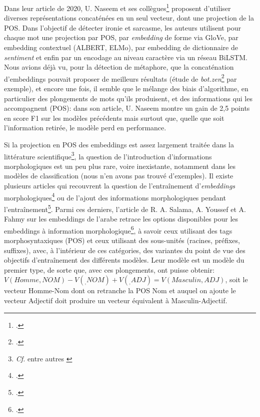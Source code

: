 Dans leur article de 2020, U. Naseem et ses collègues\footcite{naseem_towards_2020} proposent d'utiliser diverses représentations concaténées en un seul vecteur, dont une projection de la POS. Dans l'objectif de détecter ironie et sarcasme, les auteurs utilisent pour chaque mot une projection par POS, par \textit{embedding} de forme via GloVe, par embedding contextuel (ALBERT, ELMo), par embedding de dictionnaire de \textit{sentiment} et enfin par un encodage au niveau caractère via un réseau BiLSTM. Nous avions déjà vu, pour la détection de métaphore, que la concaténation d'embeddings pouvait proposer de meilleurs résultats (étude de \textit{bot.zen}\footcite{stemle_using_2018} par exemple), et encore une fois, il semble que le mélange des biais d'algorithme, en particulier des plongements de mots qu'ils produisent, et des informations qui les accompagnent (POS): dans son article, U. Naseem montre un gain de 2,5 points en score F1 sur les modèles précédents mais surtout que, quelle que soit l'information retirée, le modèle perd en performance.


Si la projection en POS des embeddings est assez largement traitée dans la littérature scientifique\footnote{\textit{Cf.} entre autres \textcite{fell_comparing_2019,leong_report_2018}}, la question de l'introduction d'informations morphologiques est un peu plus rare, voire inexistante, notamment dans les modèles de classification (nous n'en avons pas trouvé d'exemples). Il existe plusieurs articles qui recouvrent la question de l'entraînement d'\textit{embeddings} morphologiques\footcite{cotterell_morphological_2015} ou de l'ajout des informations morphologiques pendant l'entraînement\footcite{cui_knet_2015}. Parmi ces derniers, l'article de R. A. Salama, A. Youssef et A. Fahmy sur les embeddings de l'arabe retrace les options disponibles pour les embeddings à information morphologique\footcite{salama_morphological_2018}, à savoir ceux utilisant des tags morphosyntaxiques (POS) et ceux utilisant des sous-unités (racines, préfixes, suffixes), avec, à l'intérieur de ces catégories, des variantes du point de vue des objectifs d'entraînement des différents modèles. Leur modèle est un modèle du premier type, de sorte que, avec ces plongements, ont puisse obtenir: $V(Homme,NOM) - V(_,NOM) + V(_,ADJ) = V(Masculin,ADJ)$, soit le vecteur Homme-Nom dont on retranche la POS Nom et auquel on ajoute le vecteur Adjectif doit produire un vecteur équivalent à Masculin-Adjectif.

